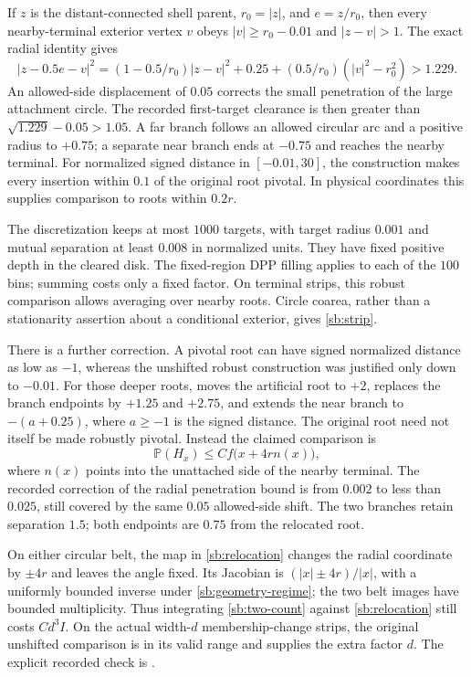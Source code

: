 \documentclass[11pt,a4paper]{article}
\theoremstyle{definition}
\theoremstyle{remark}
\numberwithin{equation}{section}
\begin{document}
If $z$ is the distant-connected shell parent, $r_0=|z|$, and
$e=z/r_0$, then every nearby-terminal exterior vertex $v$ obeys
$|v|\ge r_0-0.01$ and $|z-v|>1$. The exact radial identity gives
\[
 |z-0.5e-v|^2
  =(1-0.5/r_0)|z-v|^2+0.25
       +(0.5/r_0)(|v|^2-r_0^2)>1.229.
\]
An allowed-side displacement of $0.05$ corrects the small penetration
of the large attachment circle. The recorded first-target clearance
is then greater than $\sqrt{1.229}-0.05>1.05$. A far branch follows
an allowed circular arc and a positive radius to $+0.75$; a separate
near branch ends at $-0.75$ and reaches the nearby terminal. For
normalized signed distance in $[-0.01,30]$, the construction makes
every insertion within $0.1$ of the original root pivotal. In physical
coordinates this supplies comparison to roots within $0.2r$.

The discretization keeps at most $1000$ targets, with target radius
$0.001$ and mutual separation at least $0.008$ in normalized units.
They have fixed positive depth in the cleared disk. The fixed-region
DPP filling applies to each of the $100$ bins; summing costs only a
fixed factor. On terminal strips, this robust comparison allows
averaging over nearby roots. Circle coarea, rather than a stationarity
assertion about a conditional exterior, gives \eqref{sb:strip}.

There is a further correction. A pivotal root can have signed
normalized distance as low as $-1$, whereas the unshifted robust
construction was justified only down to $-0.01$. For those deeper
roots,  moves the artificial root
to $+2$, replaces the branch endpoints by $+1.25$ and $+2.75$, and
extends the near branch to $-(a+0.25)$, where $a\ge-1$ is the signed
distance. The original root need not itself be made robustly pivotal.
Instead the claimed comparison is
\begin{equation}
 \mathbb P(H_x)\le C f\bigl(x+4r n(x)\bigr),
 \label{sb:relocation}
\end{equation}
where $n(x)$ points into the unattached side of the nearby terminal.
The recorded correction of the radial penetration bound is from
$0.002$ to less than $0.025$, still covered by the same $0.05$
allowed-side shift. The two branches retain separation $1.5$; both
endpoints are $0.75$ from the relocated root.

On either circular belt, the map in \eqref{sb:relocation} changes the
radial coordinate by $\pm4r$ and leaves the angle fixed. Its Jacobian
is $(|x|\pm4r)/|x|$, with a uniformly bounded inverse under
\eqref{sb:geometry-regime}; the two belt images have bounded
multiplicity. Thus integrating \eqref{sb:two-count} against
\eqref{sb:relocation} still costs $Cd^3I$. On the actual width-$d$
membership-change strips, the original unshifted comparison is in
its valid range and supplies the extra factor $d$. The explicit
recorded check is .
\end{document}
